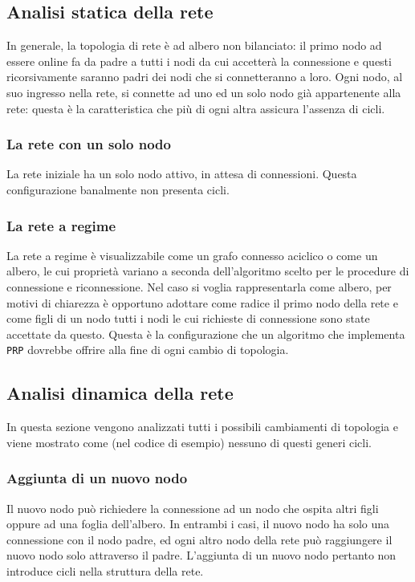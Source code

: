 \documentclass[10pt]{article} %
\begin{document}
\subsection{Analisi statica della rete}
In generale, la topologia di rete è ad albero non bilanciato: il primo nodo ad essere online fa da padre a tutti i nodi da cui accetterà la connessione e questi ricorsivamente saranno padri dei nodi che si connetteranno a loro. Ogni nodo, al suo ingresso nella rete, si connette ad uno ed un solo nodo già appartenente alla rete: questa è la caratteristica che più di ogni altra assicura l'assenza di cicli.
\subsubsection{La rete con un solo nodo}
La rete iniziale ha un solo nodo attivo, in attesa di connessioni. Questa configurazione banalmente non presenta cicli.
\subsubsection{La rete a regime}
La rete a regime è visualizzabile come un grafo connesso aciclico o come un albero, le cui proprietà variano a seconda dell'algoritmo scelto per le procedure di connessione e riconnessione. Nel caso si voglia rappresentarla come albero, per motivi di chiarezza è opportuno adottare come radice il primo nodo della rete e come figli di un nodo tutti i nodi le cui richieste di connessione sono state accettate da questo. Questa è la configurazione che un algoritmo che implementa {\tt PRP} dovrebbe offrire alla fine di ogni cambio di topologia.

\subsection{Analisi dinamica della rete}
In questa sezione vengono analizzati tutti i possibili cambiamenti di topologia e viene mostrato come (nel codice di esempio) nessuno di questi generi cicli.
\subsubsection{Aggiunta di un nuovo nodo}
Il nuovo nodo può richiedere la connessione ad un nodo che ospita altri figli oppure ad una foglia dell'albero. In entrambi i casi, il nuovo nodo ha solo una connessione con il nodo padre, ed ogni altro nodo della rete può raggiungere il nuovo nodo solo attraverso il padre. L'aggiunta di un nuovo nodo pertanto non introduce cicli nella struttura della rete.
\end{document}
